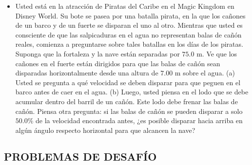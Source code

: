 \documentclass[11pt,a4paper]{article}
\begin{document}
\begin{itemize}
    \item[\textbf{48.}] Usted está en la atracción de Piratas del Caribe en el Magic Kingdom en Disney World. Su bote se pasea por una batalla pirata, en la que los cañones de un barco y de un fuerte se disparan el uno al otro. Mientras que usted es consciente de que las salpicaduras en el agua no representan balas de cañón reales, comienza a preguntarse sobre tales batallas en los días de los piratas. Suponga que la fortaleza y la nave están separadas por $75.0 \text{ m}$. Ve que los cañones en el fuerte están dirigidos para que las balas de cañón sean disparadas horizontalmente desde una altura de $7.00 \text{ m}$ sobre el agua. (a) Usted se pregunta a qué velocidad se deben disparar para que peguen en el barco antes de caer en el agua. (b) Luego, usted piensa en el lodo que se debe acumular dentro del barril de un cañón. Este lodo debe frenar las balas de cañón. Piensa otra pregunta: si las balas de cañón se pueden disparar a solo $50.0\%$ de la velocidad encontrada antes, ¿es posible disparar hacia arriba en algún ángulo respecto horizontal para que alcancen la nave?
    \vspace*{7cm}
\end{itemize}

\newpage

\subsection*{PROBLEMAS DE DESAFÍO}
\end{document}
